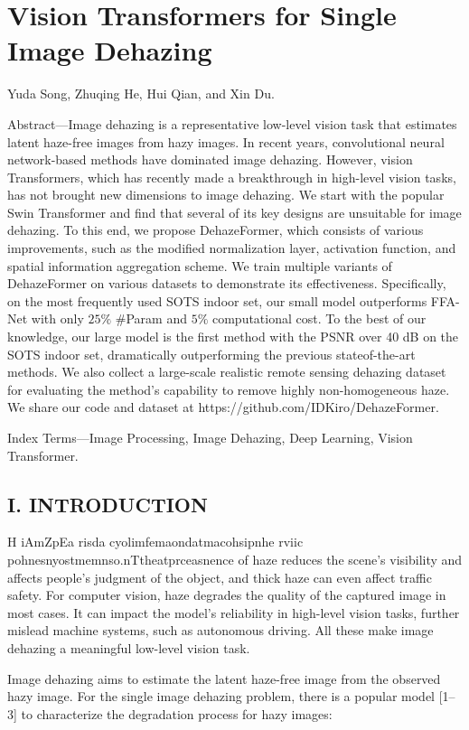 \section{Vision Transformers for Single Image Dehazing}

Yuda Song, Zhuqing He, Hui Qian, and Xin Du.

Abstract—Image dehazing is a representative low-level vision task that estimates latent haze-free images from hazy images. In recent years, convolutional neural network-based methods have dominated image dehazing. However, vision Transformers, which has recently made a breakthrough in high-level vision tasks, has not brought new dimensions to image dehazing. We start with the popular Swin Transformer and find that several of its key designs are unsuitable for image dehazing. To this end, we propose DehazeFormer, which consists of various improvements, such as the modified normalization layer, activation function, and spatial information aggregation scheme. We train multiple variants of DehazeFormer on various datasets to demonstrate its effectiveness. Specifically, on the most frequently used SOTS indoor set, our small model outperforms FFA-Net with only $25\%$ \#Param and $5\%$ computational cost. To the best of our knowledge, our large model is the first method with the PSNR over 40 dB on the SOTS indoor set, dramatically outperforming the previous stateof-the-art methods. We also collect a large-scale realistic remote sensing dehazing dataset for evaluating the method’s capability to remove highly non-homogeneous haze. We share our code and dataset at https://github.com/IDKiro/DehazeFormer.

Index Terms—Image Processing, Image Dehazing, Deep Learning, Vision Transformer.

\subsection{I. INTRODUCTION}

H iAmZpEa risda cyolimfemaondatmacohsipnhe rviic pohnesnyostmemnso.nTtheatprceasnence of haze reduces the scene’s visibility and affects people’s judgment of the object, and thick haze can even affect traffic safety. For computer vision, haze degrades the quality of the captured image in most cases. It can impact the model’s reliability in high-level vision tasks, further mislead machine systems, such as autonomous driving. All these make image dehazing a meaningful low-level vision task.

Image dehazing aims to estimate the latent haze-free image from the observed hazy image. For the single image dehazing problem, there is a popular model [1–3] to characterize the degradation process for hazy images:

